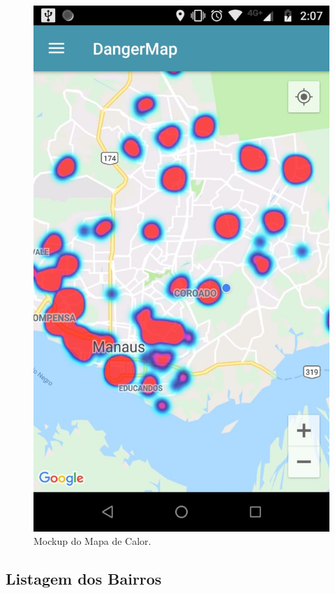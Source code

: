 \documentclass[
	12pt,				%
	openright,			%
	twoside,			%
	a4paper,			%
	english,			%
	french,				%
	spanish,			%
	brazil,				%
	]{abntex2}
\begin{document}
\begin{figure}[h]
	\caption{\label{tela_principal}Mockup do Mapa de Calor.}
	\begin{center}
		\includegraphics[scale=0.2]{figuras/tela-heatmap.jpeg}
	\end{center}
\end{figure}

\subsection{Listagem dos Bairros}
\end{document}
